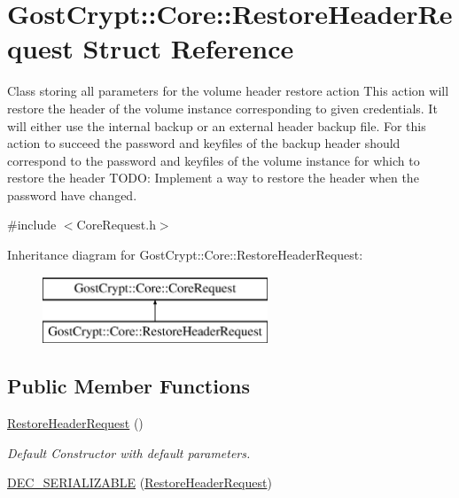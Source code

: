 \hypertarget{struct_gost_crypt_1_1_core_1_1_restore_header_request}{}\section{Gost\+Crypt\+:\+:Core\+:\+:Restore\+Header\+Request Struct Reference}
\label{struct_gost_crypt_1_1_core_1_1_restore_header_request}


Class storing all parameters for the volume header restore action This action will restore the header of the volume instance corresponding to given credentials. It will either use the internal backup or an external header backup file. For this action to succeed the password and keyfiles of the backup header should correspond to the password and keyfiles of the volume instance for which to restore the header T\+O\+DO\+: Implement a way to restore the header when the password have changed.  




{\ttfamily \#include $<$Core\+Request.\+h$>$}

Inheritance diagram for Gost\+Crypt\+:\+:Core\+:\+:Restore\+Header\+Request\+:\begin{figure}[H]
\begin{center}
\leavevmode
\includegraphics[height=2.000000cm]{struct_gost_crypt_1_1_core_1_1_restore_header_request}
\end{center}
\end{figure}
\subsection*{Public Member Functions}
\begin{DoxyCompactItemize}
\item 
\hyperlink{struct_gost_crypt_1_1_core_1_1_restore_header_request_a1a8eac2c7a809e7bfeea266823861c32}{Restore\+Header\+Request} ()
\begin{DoxyCompactList}\small\item\em Default Constructor with default parameters. \end{DoxyCompactList}\item 
\hyperlink{struct_gost_crypt_1_1_core_1_1_restore_header_request_a345ec17cc4811bb997134f1fb8bb7b4d}{D\+E\+C\+\_\+\+S\+E\+R\+I\+A\+L\+I\+Z\+A\+B\+LE} (\hyperlink{struct_gost_crypt_1_1_core_1_1_restore_header_request}{Restore\+Header\+Request})
\end{DoxyCompactItemize}
